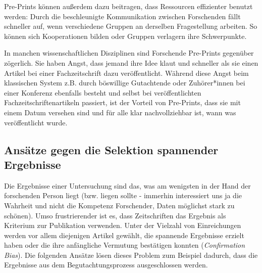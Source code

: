 \documentclass[
  letterpaper,
  DIV=11,
  numbers=noendperiod]{scrreprt}
\begin{document}
Pre-Prints können außerdem dazu beitragen, dass Ressourcen effizienter
benutzt werden: Durch die beschleunigte Kommunikation zwischen
Forschenden fällt schneller auf, wenn verschiedene Gruppen an derselben
Fragestellung arbeiten. So können sich Kooperationen bilden oder Gruppen
verlagern ihre Schwerpunkte.

\begin{tcolorbox}[enhanced jigsaw, left=2mm, colback=white, colframe=quarto-callout-note-color-frame, opacitybacktitle=0.6, opacityback=0, title=\textcolor{quarto-callout-note-color}{\faInfo}\hspace{0.5em}{Unberechtigte Sorge vor Ideenklau}, toptitle=1mm, coltitle=black, colbacktitle=quarto-callout-note-color!10!white, titlerule=0mm, bottomtitle=1mm, leftrule=.75mm, breakable, rightrule=.15mm, bottomrule=.15mm, toprule=.15mm, arc=.35mm]

In manchen wissenschaftlichen Disziplinen sind Forschende Pre-Prints
gegenüber zögerlich. Sie haben Angst, dass jemand ihre Idee klaut und
schneller als sie einen Artikel bei einer Fachzeitschrift dazu
veröffentlicht. Während diese Angst beim klassischen System z.B. durch
böswillige Gutachtende oder Zuhörer*innen bei einer Konferenz ebenfalls
besteht und selbst bei veröffentlichten Fachzeitschriftenartikeln
passiert, ist der Vorteil von Pre-Prints, dass sie mit einem Datum
versehen sind und für alle klar nachvollziehbar ist, wann was
veröffentlicht wurde.

\end{tcolorbox}

\subsection{Ansätze gegen die Selektion spannender
Ergebnisse}\label{ansuxe4tze-gegen-die-selektion-spannender-ergebnisse}

Die Ergebnisse einer Untersuchung sind das, was am wenigsten in der Hand
der forschenden Person liegt (bzw. liegen sollte - immerhin interessiert
uns ja die Wahrheit und nicht die Kompetenz Forschender, Daten möglichst
stark zu schönen). Umso frustrierender ist es, dass Zeitschriften das
Ergebnis als Kriterium zur Publikation verwenden. Unter der Vielzahl von
Einreichungen werden vor allem diejenigen Artikel gewählt, die spannende
Ergebnisse erzielt haben oder die ihre anfängliche Vermutung bestätigen
konnten (\emph{Confirmation Bias}). Die folgenden Ansätze lösen dieses
Problem zum Beispiel dadurch, dass die Ergebnisse aus dem
Begutachtungsprozess ausgeschlossen werden.
\end{document}
